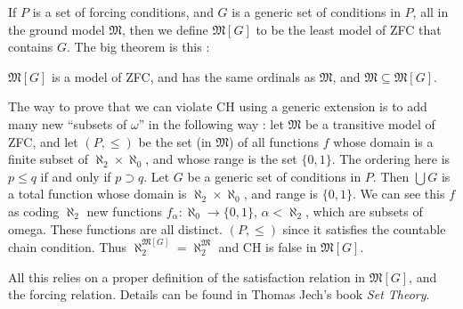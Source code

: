 \documentclass[12pt]{article}
\newcommand{\M}{\mathfrak{M}}
\newenvironment{theorem}{{\bf Theorem.}}{}
\begin{document}
If $P$ is a set of forcing conditions, and $G$ is a generic set of
conditions in $P$, all in the ground model $\M$, then we define
$\M[G]$ to be the least model of ZFC that contains $G$. The
big theorem is this :

\begin{theorem}
$\M[G]$ is a model of ZFC, and has the same ordinals as $\M$, and
$\M\subseteq \M[G]$.
\end{theorem}

The way to prove that we can violate CH using a generic extension is
to add many new ``subsets of $\omega$'' in the following way : let
$\M$ be a transitive model of ZFC, and let $(P,\leq)$ be the set (in
$\M$) of all functions $f$ whose domain is a finite subset of
$\aleph_2\times\aleph_0$, and whose range is the set $\{0,1\}$.  The
ordering here is $p\leq q$ if and only if $p\supset q$.  Let
$G$ be a generic set of conditions in $P$.  Then $\bigcup G$ is a
total function whose domain is $\aleph_2\times\aleph_0$, and range is
$\{0,1\}$.  We can see this $f$ as coding $\aleph_2$ new functions
$f_\alpha:\aleph_0\to\{0,1\}$, $\alpha<\aleph_2$, 
 which are subsets of omega.  These
functions are all distinct. $(P,\leq)$  since it satisfies the countable chain condition. Thus $\aleph_2^{\M[G]} = \aleph_2^{\M}$ and CH is false in $\M[G]$.  

All this relies on a proper definition of the satisfaction relation in
$\M[G]$, and the forcing relation.  Details can be found in Thomas Jech's book {\em Set Theory}.
\end{document}

